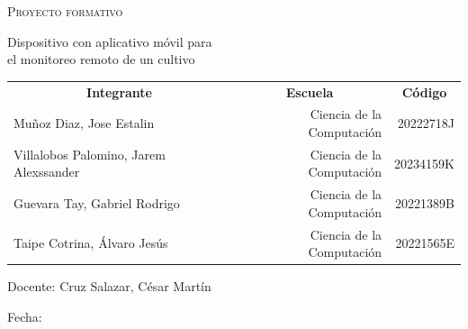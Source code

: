 \documentclass[../main]{subfiles}
\begin{document}
\begin{titlepage}
\begin{center}
		\vspace{5mm}

		{\large
			\textsc{Proyecto formativo}

			Dispositivo con aplicativo móvil para\\
			el monitoreo remoto de un cultivo
		}

		\vspace{5mm}

		\begin{table}[H]
			\centering
			\begin{tabular}{lrr}
				\multicolumn{1}{c}{\textbf{ Integrante }} &
				\multicolumn{1}{c}{\textbf{ Escuela }}    &
				\multicolumn{1}{c}{\textbf{ Código }}                                             \\
				Muñoz Diaz, Jose Estalin                  & Ciencia de la Computación & 20222718J \\
				Villalobos Palomino, Jarem Alexssander    & Ciencia de la Computación & 20234159K \\
				Guevara Tay, Gabriel Rodrigo              & Ciencia de la Computación & 20221389B \\
				Taipe Cotrina, Álvaro Jesús               & Ciencia de la Computación & 20221565E
			\end{tabular}
		\end{table}

		Docente: Cruz Salazar, César Martín

		Fecha: 
	\end{center}
	\vspace*{\fill}
\end{titlepage}
\end{document}
